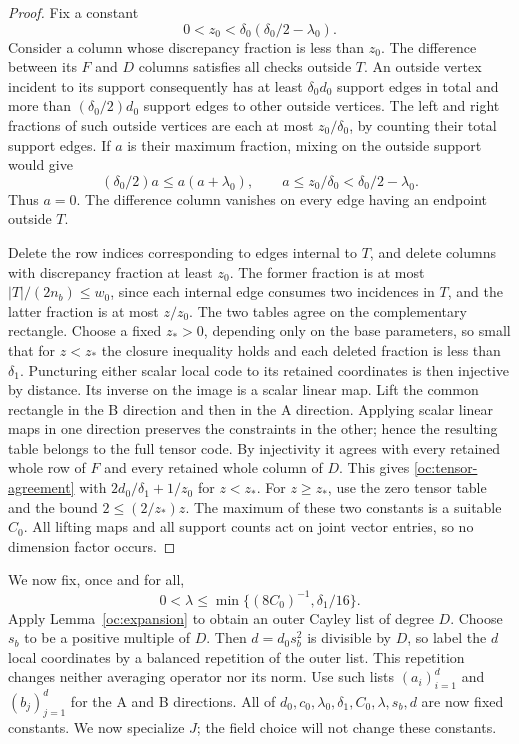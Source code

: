 \begin{proof}
Fix a constant
\[
 0<z_0<\delta_0(\delta_0/2-\lambda_0).
\]
Consider a column whose discrepancy fraction is less than $z_0$.
The difference between its $F$ and $D$ columns satisfies all checks
outside $T$.  An outside vertex incident to its support consequently
has at least $\delta_0d_0$ support edges in total and more than
$(\delta_0/2)d_0$ support edges to other outside vertices.  The left
and right fractions of such outside vertices are each at most
$z_0/\delta_0$, by counting their total support edges.  If $a$ is
their maximum fraction, mixing on the outside support would give
\[
 (\delta_0/2)a\le a(a+\lambda_0),
 \qquad a\le z_0/\delta_0<\delta_0/2-\lambda_0.
\]
Thus $a=0$.  The difference column vanishes on every edge having an
endpoint outside $T$.

Delete the row indices corresponding to edges internal to $T$, and
delete columns with discrepancy fraction at least $z_0$.  The former
fraction is at most $|T|/(2n_b)\le w_0$, since each internal edge consumes
two incidences in $T$, and the latter fraction is at most $z/z_0$.
The two tables agree on the complementary rectangle.  Choose a fixed
$z_*>0$, depending only on the base parameters, so small that for
$z<z_*$ the closure inequality holds and each deleted fraction is
less than $\delta_1$.  Puncturing either scalar local code to its
retained coordinates is then injective by distance.  Its inverse
on the image is a scalar linear map.  Lift the common rectangle in
the B direction and then in the A direction.  Applying scalar linear
maps in one direction preserves the constraints in the other; hence
the resulting table belongs to the full tensor code.  By injectivity
it agrees with every retained whole row of $F$ and every retained
whole column of $D$.  This gives \eqref{oc:tensor-agreement} with
$2d_0/\delta_1+1/z_0$ for $z<z_*$.  For $z\ge z_*$, use the zero
tensor table and the bound $2\le(2/z_*)z$.  The maximum of these two
constants is a suitable $C_0$.  All lifting maps and all support
counts act on joint vector entries, so no dimension factor occurs.
\end{proof}

We now fix, once and for all,
\begin{equation}\label{oc:lambda-choice}
 0<\lambda\le\min\{(8C_0)^{-1},\delta_1/16\}.
\end{equation}
Apply Lemma~\ref{oc:expansion} to obtain an outer Cayley list of degree
$D$.  Choose $s_b$ to be a positive multiple of $D$.  Then
$d=d_0s_b^2$ is divisible by $D$, so label the $d$ local coordinates
by a balanced repetition of the outer list.  This repetition changes
neither averaging operator nor its norm.  Use such lists
$(a_i)_{i=1}^d$ and $(b_j)_{j=1}^d$ for the A and B directions.
All of $d_0,c_0,\lambda_0,\delta_1,C_0,\lambda,s_b,d$ are now fixed
constants.  We now specialize $J$; the field choice will not change
these constants.

